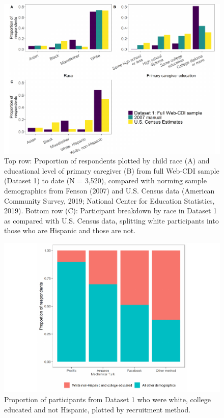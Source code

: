 \documentclass[
  english,
  ,man,floatsintext]{apa6}
\begin{document}
\begin{figure}
\centering
\includegraphics{webcdi_paper_files/figure-latex/demobarfig-1.pdf}
\caption{\label{fig:demobarfig}Top row: Proportion of respondents plotted by child race (A) and educational level of primary caregiver (B) from full Web-CDI sample (Dataset 1) to date (N = 3,520), compared with norming sample demographics from Fenson (2007) and U.S. Census data (American Community Survey, 2019; National Center for Education Statistics, 2019).
Bottom row (C): Participant breakdown by race in Dataset 1 as compared with U.S. Census data, splitting white participants into those who are Hispanic and those are not.}
\end{figure}

\begin{figure}
\centering
\includegraphics{webcdi_paper_files/figure-latex/whitecolplot-1.pdf}
\caption{\label{fig:whitecolplot}Proportion of participants from Dataset 1 who were white, college educated and not Hispanic, plotted by recruitment method.}
\end{figure}
\end{document}
